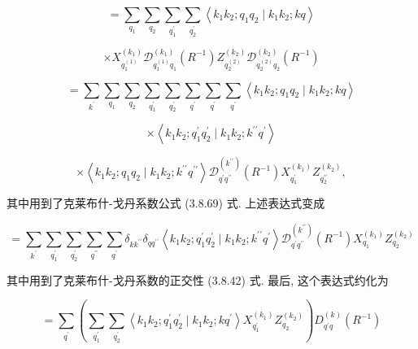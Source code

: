 $$
= \mathop{\sum }\limits_{{q}_{1}}\mathop{\sum }\limits_{{q}_{2}}\mathop{\sum }\limits_{{q}_{1}^{\prime }}\mathop{\sum }\limits_{{q}_{2}^{\prime }}\left\langle {{k}_{1}{k}_{2};{q}_{1}{q}_{2} \mid {k}_{1}{k}_{2};{kq}}\right\rangle
$$

$$
\times {X}_{{q}_{1}^{\left( 1\right) }}^{\left( {k}_{1}\right) }{\mathcal{D}}_{{q}_{1}^{\left( 1\right) }{q}_{1}}^{\left( {k}_{1}\right) }\left( {R}^{-1}\right) {Z}_{{q}_{2}^{\left( 2\right) }}^{\left( {k}_{2}\right) }{\mathcal{D}}_{{q}_{2}^{\left( 2\right) }{q}_{2}}^{\left( {k}_{2}\right) }\left( {R}^{-1}\right)
$$

$$
= \mathop{\sum }\limits_{{k}^{\prime }}\mathop{\sum }\limits_{{q}_{1}}\mathop{\sum }\limits_{{q}_{2}}\mathop{\sum }\limits_{{q}_{1}^{\prime }}\mathop{\sum }\limits_{{q}_{2}^{\prime }}\mathop{\sum }\limits_{{q}^{\prime }}\mathop{\sum }\limits_{{q}^{\prime }}\mathop{\sum }\limits_{{q}^{\prime }}\left\langle {{k}_{1}{k}_{2};{q}_{1}{q}_{2} \mid {k}_{1}{k}_{2};{kq}}\right\rangle
$$

$$
\times \left\langle {{k}_{1}{k}_{2};{q}_{1}^{\prime }{q}_{2}^{\prime } \mid {k}_{1}{k}_{2};{k}^{\prime \prime }{q}^{\prime }}\right\rangle
$$

$$
\times \left\langle {{k}_{1}{k}_{2};{q}_{1}{q}_{2} \mid {k}_{1}{k}_{2};{k}^{\prime \prime }{q}^{\prime \prime }}\right\rangle {\mathcal{D}}_{{q}^{\prime }{q}^{\prime \prime }}^{\left( {k}^{\prime \prime }\right) }\left( {R}^{-1}\right) {X}_{{q}_{1}^{\prime }}^{\left( {k}_{1}\right) }{Z}_{{q}_{2}^{\prime \prime }}^{\left( {k}_{2}\right) },
$$

其中用到了克莱布什-戈丹系数公式 (3.8.69) 式. 上述表达式变成

$$
= \mathop{\sum }\limits_{{k}^{\prime }}\mathop{\sum }\limits_{{q}_{1}^{\prime }}\mathop{\sum }\limits_{{q}_{2}^{\prime }}\mathop{\sum }\limits_{{q}^{\prime \prime }}\mathop{\sum }\limits_{{q}^{\prime }}{\delta }_{k{k}^{\prime \prime }}{\delta }_{q{q}^{\prime \prime }}\left\langle {{k}_{1}{k}_{2};{q}_{1}^{\prime }{q}_{2}^{\prime } \mid {k}_{1}{k}_{2};{k}^{\prime \prime }{q}^{\prime }}\right\rangle {\mathcal{D}}_{{q}^{\prime }{q}^{\prime \prime }}^{\left( {k}^{\prime \prime }\right) }\left( {R}^{-1}\right) {X}_{{q}_{1}}^{\left( {k}_{1}\right) }{Z}_{{q}_{2}}^{\left( {k}_{2}\right) }
$$

其中用到了克莱布什-戈丹系数的正交性 (3.8.42) 式. 最后, 这个表达式约化为

$$
= \mathop{\sum }\limits_{{q}^{\prime }}\left( {\mathop{\sum }\limits_{{q}_{1}^{\prime }}\mathop{\sum }\limits_{{q}_{2}^{\prime }}\left\langle {{k}_{1}{k}_{2};{q}_{1}^{\prime }{q}_{2}^{\prime } \mid {k}_{1}{k}_{2};k{q}^{\prime }}\right\rangle {X}_{{q}_{1}^{\prime }}^{\left( {k}_{1}\right) }{Z}_{{q}_{2}}^{\left( {k}_{2}\right) }}\right) {D}_{{q}^{\prime }q}^{\left( k\right) }\left( {R}^{-1}\right)
$$

